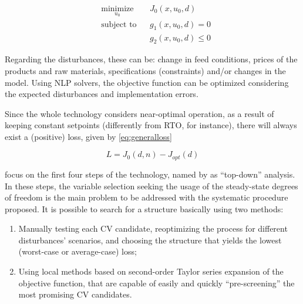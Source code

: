 \documentclass[../msc-thesis.tex]{subfiles}
\begin{document}
\begin{equation}
	\begin{aligned}
	& \underset{u_{0}}{\text{minimize}}
	& & J_{0}\left(x, u_{0}, d\right) \\
	& \text{subject to}
	& & g_{1}\left(x, u_{0}, d\right)=0 \\
	& & & g_{2}\left(x, u_{0}, d\right) \leq 0
	\end{aligned}
    \label{soc:optproblem}
\end{equation}

Regarding the disturbances, these can be: change in feed conditions, prices 
of the products and raw materials, specifications (constraints) and/or changes 
in the model. Using NLP solvers, the objective function can be optimized 
considering the expected disturbances and implementation errors.

Since the whole technology considers near-optimal operation, as a result of 
keeping constant setpoints (differently from RTO, for instance), there will 
always exist a (positive) loss, given by \autoref{eq:generalloss}

\begin{equation}
	L=J_{0}(d, n)-J_{opt}(d)
	\label{eq:generalloss}
\end{equation}

\mtc focus on the first four steps of the \soc technology, named by 
\textcite{Skogestad2000} as ``top-down'' analysis. In these steps, the 
variable selection seeking the usage of the steady-state degrees of freedom 
is the main problem to be addressed with the systematic procedure proposed. It 
is possible to search for a \soc structure basically using two methods:

\begin{enumerate}
    \item Manually testing each CV candidate, reoptimizing the process for 
	different disturbances' scenarios, and choosing the structure that yields 
	the lowest (worst-case or average-case) loss; \label{soc:method1}

	\item Using local methods based on second-order Taylor series expansion of 
    the objective function, that are capable of easily and quickly 
    ``pre-screening'' the most promising CV candidates. \label{soc:method2}
\end{enumerate}
\end{document}
